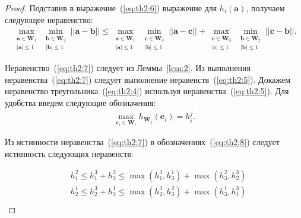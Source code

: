 \documentclass[12pt, twoside]{article}
\numberwithin{equation}{section}
\begin{document}
\begin{proof}
Подставив в выражение~(\ref{eq:th2:6}) выражение для $h_i\left(\textbf{a}\right)$, получаем следующее неравенство:
\begin{equation}
\label{eq:th2:7}
\begin{aligned}
\max_{\substack{\textbf{a} \in \textbf{W}_1 \\ \left|\textbf{a}\right| \leq 1}} \min_{\substack{\textbf{b} \in \textbf{W}_2 \\ \left|\textbf{b}\right| \leq 1}}||\textbf{a} - \textbf{b}|| \leq 
\max_{\substack{\textbf{a} \in \textbf{W}_1 \\ \left|\textbf{a}\right| \leq 1}} \min_{\substack{\textbf{c} \in \textbf{W}_3 \\ \left|\textbf{b}\right| \leq 1}}||\textbf{a} - \textbf{c}||+
\max_{\substack{\textbf{c} \in \textbf{W}_3 \\ \left|\textbf{c}\right| \leq 1}} \min_{\substack{\textbf{b} \in \textbf{W}_2 \\ \left|\textbf{b}\right| \leq 1}}||\textbf{c} - \textbf{b}||.
\end{aligned}
\end{equation}

Неравенство~(\ref{eq:th2:7}) следует из Леммы~\ref{lem:2}. Из выполнения неравенства~(\ref{eq:th2:7}) следует выполнение неравенств~(\ref{eq:th2:5}).
Докажем неравенство треугольника~(\ref{eq:th2:4}) используя неравенства~(\ref{eq:th2:5}). Для удобства введем следующие обозначения:
\begin{equation}
\label{eq:th2:8}
\begin{aligned}
\max_{\textbf{e}_i \in \textbf{W}_i} h_{\textbf{W}_j}\left(\textbf{e}_i\right) = h_{i}^{j}.
\end{aligned}
\end{equation}

Из истинности неравенства~(\ref{eq:th2:7}) в обозначениях~(\ref{eq:th2:8}) следует истинность следующих неравенств:
 
\begin{equation}
\label{eq:th2:9}
\begin{aligned}
\quad h_{1}^{2} \leq h_{1}^{3} + h_{3}^{2} \leq \max\left(h_{1}^{3}, h_{3}^{1}\right) + \max\left(h_{3}^{2}, h_{2}^{3}\right)\\
\quad h_{2}^{1} \leq h_{2}^{3} + h_{3}^{1} \leq \max\left(h_{2}^{3}, h_{3}^{2}\right) + \max\left(h_{3}^{1}, h_{1}^{3}\right)\\
\end{aligned}
\end{equation}


\end{proof}
\end{document}

